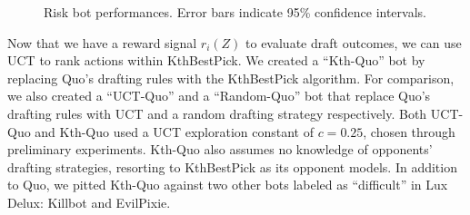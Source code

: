 \documentclass[letterpaper]{article}
\numberwithin{equation}{section}
\numberwithin{theorem}{section}
\numberwithin{lemma}{section}
\numberwithin{df}{section}
\begin{document}
\begin{figure}[t]
{		\label{fig:KthQuoEvilP}
	} %
	\caption[]{Risk bot performances.  Error bars indicate 95\% confidence intervals.}
	\label{fig:RiskResults}
\end{figure}

Now that we have a reward signal $r_i(Z)$ to evaluate draft outcomes, we can use UCT to rank actions within KthBestPick.  We created a ``Kth-Quo'' bot by replacing Quo's drafting rules with the KthBestPick algorithm.  For comparison, we also created a ``UCT-Quo'' and a ``Random-Quo'' bot that replace Quo's drafting rules with UCT and a random drafting strategy respectively.  Both UCT-Quo and Kth-Quo used a UCT exploration constant of $c=0.25$, chosen through preliminary experiments.  Kth-Quo also assumes no knowledge of opponents' drafting strategies, resorting to KthBestPick as its opponent models.  In addition to Quo, we pitted Kth-Quo against two other bots labeled as ``difficult'' in Lux Delux: Killbot and EvilPixie.  

\end{document}
